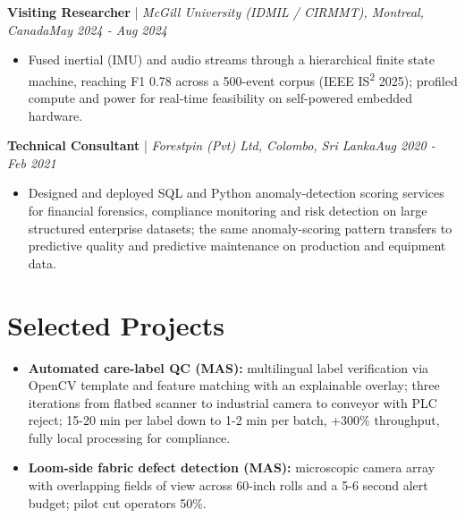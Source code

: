 \documentclass[11pt]{article}
\newenvironment{cvrole}[5]{%
  \par\noindent\textbf{\large #1} | \textit{\small #2, #3}\hfill \textit{\small #4 - #5}\par
  \begin{itemize}[leftmargin=2em, itemsep=-0.3em, topsep=-0.5em]%
}{%
  \end{itemize}\par\noindent\mbox{}\par\vspace{0.1em}%
}
\begin{document}
\begin{cvrole}{Visiting Researcher}{McGill University (IDMIL / CIRMMT)}{Montreal, Canada}{May 2024}{Aug 2024}
    \item Fused inertial (IMU) and audio streams through a hierarchical finite state machine, reaching F1 0.78 across a 500-event corpus (IEEE IS\textsuperscript{2} 2025); profiled compute and power for real-time feasibility on self-powered embedded hardware.
\end{cvrole}

\begin{cvrole}{Technical Consultant}{Forestpin (Pvt) Ltd}{Colombo, Sri Lanka}{Aug 2020}{Feb 2021}
    \item Designed and deployed SQL and Python anomaly-detection scoring services for financial forensics, compliance monitoring and risk detection on large structured enterprise datasets; the same anomaly-scoring pattern transfers to predictive quality and predictive maintenance on production and equipment data.
\end{cvrole}

\section*{Selected Projects \footnotesize {}}
\begin{itemize}[leftmargin=1.2em, itemsep=-0.25em]
    \item \textbf{Automated care-label QC (MAS):} multilingual label verification via OpenCV template and feature matching with an explainable overlay; three iterations from flatbed scanner to industrial camera to conveyor with PLC reject; 15-20 min per label down to 1-2 min per batch, +300\% throughput, fully local processing for compliance.
    \item \textbf{Loom-side fabric defect detection (MAS):} microscopic camera array with overlapping fields of view across 60-inch rolls and a 5-6 second alert budget; pilot cut operators 50\%.
\end{itemize}

\enlargethispage{4\baselineskip}
\vspace{-0.3em}
\end{document}
